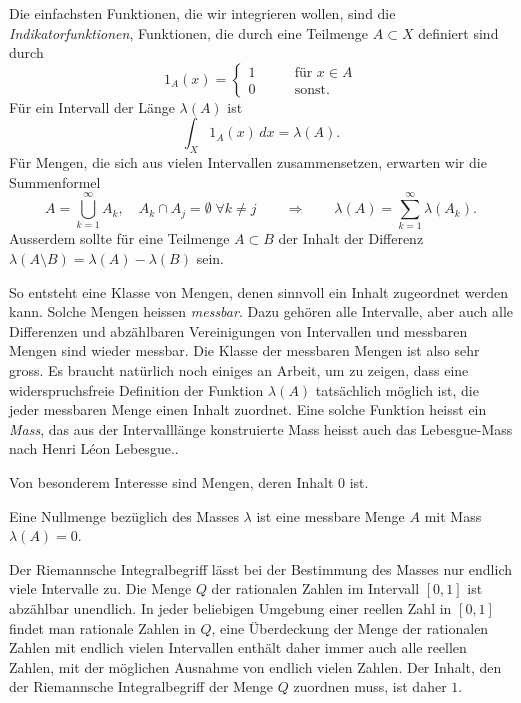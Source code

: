 Die einfachsten Funktionen, die wir integrieren wollen, sind die
{\em Indikatorfunktionen}, Funktionen, die durch eine Teilmenge
$A\subset X$ definiert sind durch
\[
1_A(x)
=
\begin{cases}
1&\qquad\text{für $x\in A$}\\
0&\qquad\text{sonst}.
\end{cases}
\]
Für ein Intervall der Länge $\lambda(A)$ ist
\[
\int_X 1_A(x)\,dx = \lambda(A).
\]
Für Mengen, die sich aus vielen Intervallen zusammensetzen, erwarten wir
die Summenformel
\[
A=\bigcup_{k=1}^\infty A_k,
\quad
A_k\cap A_j = \emptyset\;\forall k\ne j
\qquad\Rightarrow\qquad
\lambda(A) = \sum_{k=1}^\infty \lambda(A_k).
\]
Ausserdem sollte für eine Teilmenge $A\subset B$ der Inhalt der
Differenz $\lambda(A\setminus B)=\lambda(A)-\lambda(B)$ sein.

So entsteht eine Klasse von Mengen, denen sinnvoll ein Inhalt 
zugeordnet werden kann.
Solche Mengen heissen {\em messbar}.
Dazu gehören alle Intervalle, aber auch alle Differenzen und
abzählbaren Vereinigungen von Intervallen und messbaren Mengen
sind wieder messbar.
Die Klasse der messbaren Mengen ist also sehr gross.
Es braucht natürlich noch einiges an Arbeit, um zu zeigen, dass
eine widerspruchsfreie Definition der Funktion $\lambda(A)$
tatsächlich möglich ist, die jeder messbaren Menge einen
Inhalt zuordnet.
Eine solche Funktion heisst ein {\em Mass}, das aus der Intervalllänge
konstruierte Mass heisst auch das Lebesgue-Mass nach Henri Léon Lebesgue..
%
%

Von besonderem Interesse sind Mengen, deren Inhalt $0$ ist.

\begin{definition}
\label{buch:skalarprodukt:funktionenraeume:definition:nullmenge}
Eine Nullmenge bezüglich des Masses $\lambda$ ist eine messbare
Menge $A$ mit Mass $\lambda(A)=0$.
\end{definition}

Der Riemannsche Integralbegriff lässt bei der Bestimmung des Masses
nur endlich viele Intervalle zu. 
Die Menge $Q$ der rationalen Zahlen im Intervall $[0,1]$ ist abzählbar
unendlich.
In jeder beliebigen Umgebung einer reellen Zahl in $[0,1]$ findet man
rationale Zahlen in $Q$, eine Überdeckung der Menge der rationalen
Zahlen mit endlich vielen Intervallen enthält daher immer auch alle
reellen Zahlen, mit der möglichen Ausnahme von endlich vielen Zahlen.
Der Inhalt, den der Riemannsche Integralbegriff der Menge $Q$ zuordnen
muss, ist daher $1$.

